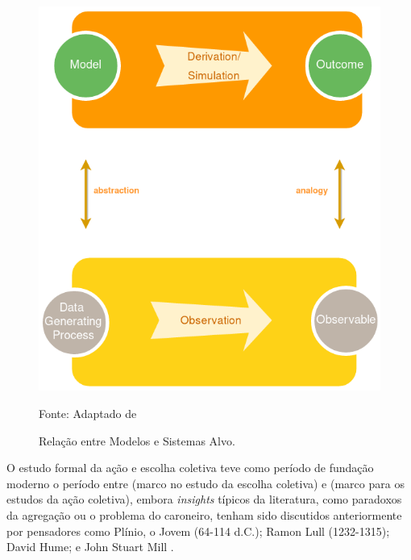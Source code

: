 \begin{figure}[H]
  \centering \includegraphics[scale = 0.5]{ims/ms.png}
  \caption{Relação entre Modelos e Sistemas Alvo.}
  Fonte: Adaptado de 
\end{figure}

O estudo formal da ação e escolha coletiva teve como período de fundação moderno
o período entre  (marco no estudo da escolha coletiva)
e  (marco para os estudos da ação coletiva), embora
\textit{insights} típicos da literatura, como paradoxos da agregação ou o
problema do caroneiro, tenham sido discutidos anteriormente por pensadores como
Plínio, o Jovem (64-114 d.C.); Ramon Lull (1232-1315); David Hume; e John Stuart
Mill \cite{mclean2015strange, sep-free-rider, ordeshook1990emerging}. 


